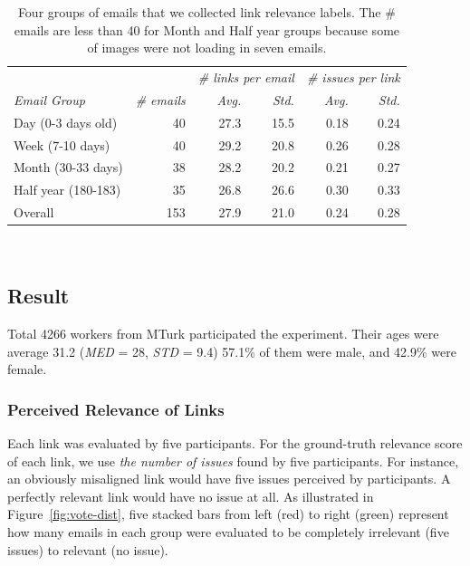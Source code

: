 \documentclass{sigchi}
\begin{document}
\begin{table}
  \small
  \centering
  \begin{tabular}{l r r r | r r}
    & & \multicolumn{2}{c}{\small{\textit{\# links per email}}} & \multicolumn{2}{c}{\small{\textit{\# issues per link}}} \\
    {\small\textit{Email Group}}     & {\small \textit{\# emails}}   & {\small \textit{Avg.}} & {\small \textit{Std.}} & {\small \textit{Avg.}} & {\small \textit{Std.}}\\
    \midrule
    Day (0-3 days old)          & 40    & 27.3  & 15.5  & 0.18  & 0.24\\
    Week (7-10 days)            & 40    & 29.2  & 20.8  & 0.26  & 0.28\\
    Month (30-33 days)          & 38    & 28.2  & 20.2  & 0.21  & 0.27\\
    Half year (180-183)         & 35    & 26.8  & 26.6  & 0.30  & 0.33\\
    \midrule
    Overall                     & 153    & 27.9  & 21.0 &  0.24 & 0.28\\
  \end{tabular}
  \caption{Four groups of emails that we collected link relevance labels. The \# emails are less than 40 for Month and Half year groups because some of images were not loading in seven emails.}~\label{tab:email_groups}
\end{table}


\subsection{Result}
Total 4266 workers from MTurk participated the experiment. Their ages were average 31.2 (\textit{MED} = 28, \textit{STD} = 9.4)  57.1\% of them were male, and 42.9\% were female. %

\subsubsection{Perceived Relevance of Links}
Each link was evaluated by five participants. For the ground-truth relevance score of each link, we use \textit{the number of issues} found by five participants. For instance, an obviously misaligned link would have five issues perceived by participants. A perfectly relevant link would have no issue at all. As illustrated in Figure~\ref{fig:vote-dist}, five stacked bars from left (red) to right (green) represent how many emails in each group were evaluated to be completely irrelevant (five issues) to relevant (no issue). 
\end{document}
